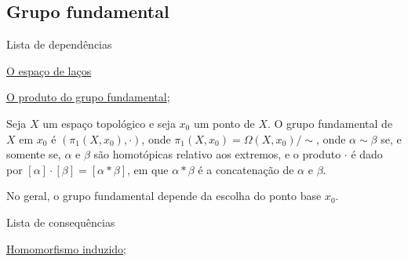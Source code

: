 \subsection{Grupo fundamental}
\label{grupo-fundamental-def}
\begin{titlemize}{Lista de dependências}
	\item \hyperref[espaco-lacos-def]{O espaço de laços}
	\item \hyperref[produto-bem-definido-prop]{O produto do grupo fundamental};\\ %
\end{titlemize}
\begin{defi}
    Seja $X$ um espaço topológico e seja $x_0$ um ponto de $X.$ O grupo fundamental de $X$ em $x_0$ é $(\pi_1(X,x_0),\cdot)$, onde $\pi_1(X,x_0) = \Omega(X,x_0)/\sim$, onde $\alpha \sim \beta$ se, e somente se, $\alpha$ e $\beta$ são homotópicas relativo aos extremos, e o produto $\cdot$ é dado por $[\alpha]\cdot[\beta] = [\alpha \ast \beta]$, em que $\alpha \ast \beta$ é a concatenação de $\alpha$ e $\beta$.
\end{defi}

No geral, o grupo fundamental depende da escolha do ponto base $x_0$.

\begin{titlemize}{Lista de consequências}
	\item \hyperref[hom-grupo-fundamental]{Homomorfismo induzido};%
\end{titlemize}
